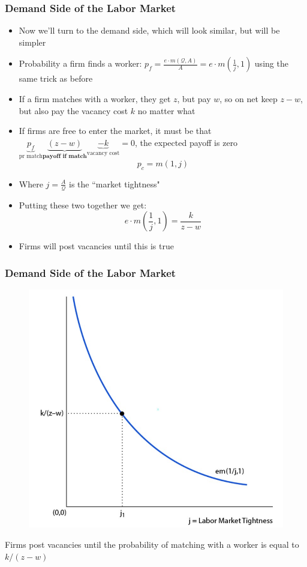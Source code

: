 \documentclass{beamer}
\begin{document}
\begin{frame}
\frametitle[alignment=center]{Demand Side of the Labor Market}
\begin{itemize}
\item Now we'll turn to the demand side, which will look similar, but will be simpler
\item Probability a firm finds a worker: $p_f=\frac{e\cdot m(\mathcal{Q},A)}{A}=e\cdot m(\frac{1}{j},1)$ using the same trick as before
\item If a firm matches with a worker, they get $z$, but pay $w$, so on net keep $z-w$, but also pay the vacancy cost $k$ no matter what
\item If firms are free to enter the market, it must be that $\underbrace{p_f}_{\text{pr match}}\underbrace{(z-w)}_{\textbf{payoff if match}}\underbrace{-k}_{\text{vacancy cost}}=0$, the expected payoff is zero 
$$p_c=m(1,j)$$
\item Where $j=\frac{A}{\mathcal{Q}}$ is the ``market tightness"
\item Putting these two together we get:
$$e\cdot m\left(\frac{1}{j},1\right)=\frac{k}{z-w}$$
\item Firms will post vacancies until this is true
\end{itemize}
\end{frame}

 
\begin{frame}
\frametitle[alignment=center]{Demand Side of the Labor Market}
\begin{figure}
\centering
\includegraphics[scale=0.5]{Figures/W_Fig_6pt19.png}
\end{figure}
Firms post vacancies until the probability of matching with a worker is equal to $k/(z-w)$
\end{frame}
\end{document}
